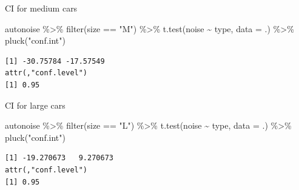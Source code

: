 \documentclass[
  ignorenonframetext,
]{beamer}
\newenvironment{Shaded}{\begin{snugshade}}{\end{snugshade}}
\newcommand{\AttributeTok}[1]{\textcolor[rgb]{0.40,0.45,0.13}{#1}}
\newcommand{\FunctionTok}[1]{\textcolor[rgb]{0.28,0.35,0.67}{#1}}
\newcommand{\NormalTok}[1]{\textcolor[rgb]{0.00,0.23,0.31}{#1}}
\newcommand{\SpecialCharTok}[1]{\textcolor[rgb]{0.37,0.37,0.37}{#1}}
\newcommand{\StringTok}[1]{\textcolor[rgb]{0.13,0.47,0.30}{#1}}
\begin{document}
\begin{frame}[fragile]{CI for medium cars}
\protect\hypertarget{ci-for-medium-cars}{}
\begin{Shaded}
\begin{Highlighting}[]
\NormalTok{autonoise }\SpecialCharTok{\%\textgreater{}\%}
  \FunctionTok{filter}\NormalTok{(size }\SpecialCharTok{==} \StringTok{"M"}\NormalTok{) }\SpecialCharTok{\%\textgreater{}\%}
  \FunctionTok{t.test}\NormalTok{(noise }\SpecialCharTok{\textasciitilde{}}\NormalTok{ type, }\AttributeTok{data =}\NormalTok{ .) }\SpecialCharTok{\%\textgreater{}\%}
  \FunctionTok{pluck}\NormalTok{(}\StringTok{"conf.int"}\NormalTok{)}
\end{Highlighting}
\end{Shaded}

\begin{verbatim}
[1] -30.75784 -17.57549
attr(,"conf.level")
[1] 0.95
\end{verbatim}
\end{frame}

\begin{frame}[fragile]{CI for large cars}
\protect\hypertarget{ci-for-large-cars}{}
\begin{Shaded}
\begin{Highlighting}[]
\NormalTok{autonoise }\SpecialCharTok{\%\textgreater{}\%}
  \FunctionTok{filter}\NormalTok{(size }\SpecialCharTok{==} \StringTok{"L"}\NormalTok{) }\SpecialCharTok{\%\textgreater{}\%}
  \FunctionTok{t.test}\NormalTok{(noise }\SpecialCharTok{\textasciitilde{}}\NormalTok{ type, }\AttributeTok{data =}\NormalTok{ .) }\SpecialCharTok{\%\textgreater{}\%}
  \FunctionTok{pluck}\NormalTok{(}\StringTok{"conf.int"}\NormalTok{)}
\end{Highlighting}
\end{Shaded}

\begin{verbatim}
[1] -19.270673   9.270673
attr(,"conf.level")
[1] 0.95
\end{verbatim}
\end{frame}
\end{document}
